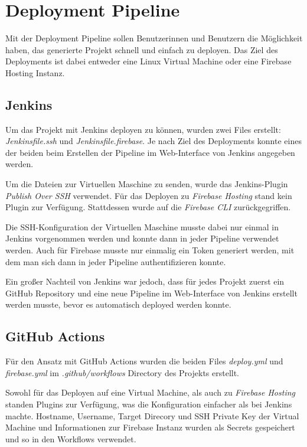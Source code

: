 \section{Deployment Pipeline}
Mit der Deployment Pipeline sollen Benutzerinnen und Benutzern die Möglichkeit haben, das generierte Projekt schnell
und einfach zu deployen.
Das Ziel des Deployments ist dabei entweder eine Linux Virtual Machine oder eine Firebase Hosting Instanz.

\subsection{Jenkins}
Um das Projekt mit Jenkins deployen zu können, wurden zwei Files erstellt: \textit{Jenkinsfile.ssh} und
\textit{Jenkinsfile.firebase}.
Je nach Ziel des Deployments konnte eines der beiden beim Erstellen der Pipeline im Web-Interface von Jenkins
angegeben werden.

Um die Dateien zur Virtuellen Maschine zu senden, wurde das Jenkins-Plugin \textit{Publish Over SSH}
verwendet.
Für das Deployen zu \textit{Firebase Hosting} stand kein Plugin zur Verfügung.
Stattdessen wurde auf die \textit{Firebase CLI} zurückgegriffen.

Die SSH-Konfiguration der Virtuellen Maschine musste dabei nur einmal in Jenkins vorgenommen werden und konnte
dann in jeder Pipeline verwendet werden.
Auch für Firebase musste nur einmalig ein Token generiert werden, mit dem man sich dann in jeder Pipeline
authentifizieren konnte.

Ein großer Nachteil von Jenkins war jedoch, dass für jedes Projekt zuerst ein GitHub
Repository und eine neue Pipeline im Web-Interface von Jenkins erstellt werden
musste, bevor es automatisch deployed werden konnte.

\subsection{GitHub Actions}
Für den Ansatz mit GitHub Actions wurden die beiden Files \textit{deploy.yml} und \textit{firebase.yml} im
\textit{.github/workflows} Directory des Projekts erstellt.

Sowohl für das Deployen auf eine Virtual Machine, als auch zu \textit{Firebase Hosting}
standen Plugins zur Verfügung, was die Konfiguration einfacher als bei Jenkins machte.
Hostname, Username, Target Direcory und SSH Private Key der Virtual Machine und Informationen zur Firebase Instanz
wurden als Secrets gespeichert und so in den Workflows verwendet.


